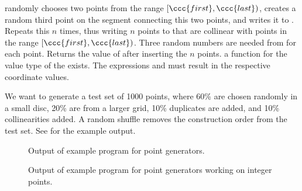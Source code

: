 { randomly chooses two points from the range $[\ccc{first},\ccc{last})$,
    creates a random third point on the segment connecting this two
    points, and writes it to . Repeats this $n$ times, thus
    writing $n$ points to  that are collinear with points
    in the range $[\ccc{first},\ccc{last})$.
    Three random numbers are needed from  for each point.
    Returns the value of  after inserting the $n$ points.
  \ccPrecond a function  for the value type of
    the  exists. 
    The expressions  and
     must result in the respective
    coordinate values.
}

\ccExample

We want to generate a test set of 1000 points, where 60\% are chosen
randomly in a small disc, 20\% are from a larger grid, 10\% duplicates
are added, and 10\% collinearities added. A random shuffle removes the
construction order from the test set. See  for the example output.


\begin{ccTexOnly}
  \begin{figure}
    \noindent
    \hspace*{0.025\textwidth}%
    \begin{minipage}{0.45\textwidth}%
      \caption{Output of example program for point generators.}
      \label{figurePointGenerator}
    \end{minipage}%
    \hspace*{0.05\textwidth}%
    \begin{minipage}{0.45\textwidth}%
      \caption{Output of example program for point generators working
        on integer points.}
      \label{figureIntegerPointGenerator}
    \end{minipage}%
  \end{figure}
\end{ccTexOnly}

